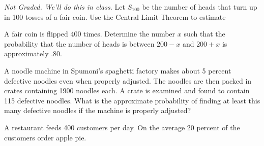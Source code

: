 \documentclass[addpoints,12pt]{exam}
\begin{document}
\begin{questions}
\question \emph{Not Graded. We'll do this in class.} 
Let $S_{100}$ be the number of heads that turn up in 100 tosses of a fair coin. Use
the Central Limit Theorem to estimate
\noaddpoints
{}

\question[2] A fair coin is flipped 400 times.
Determine the number $x$ such that the probability that the number of heads is between $200 - x$ and $200 + x$ is approximately .80.

\vspace{1.5in}

\question[2] A noodle machine in Spumoni’s spaghetti factory makes about 5 percent defective noodles even when properly adjusted. The noodles are then packed
in crates containing 1900 noodles each. A crate is examined and found to
contain 115 defective noodles. What is the approximate probability of finding
at least this many defective noodles if the machine is properly adjusted?

\vspace{1.7in}

\question[4] A restaurant feeds 400 customers per day. On the average 20 percent of the
customers order apple pie.
\noaddpoints
{}
\end{questions}
\end{document}
